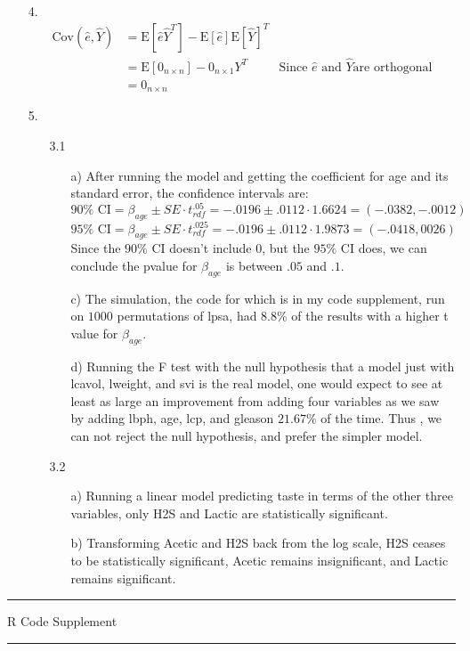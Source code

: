 \documentclass[11pt]{article}
\newcommand{\E}{\mathrm{E}}
\newcommand{\cov}{\mathrm{Cov}}
\theoremstyle{definition}
\begin{document}
\begin{itemize}
    \item[4.]
        \begin{align*}
            \cov(\hat e, \hat Y) &= \E\left[\hat e \hat Y^T\right] - \E\left[\hat e\right] \E\left[\hat Y\right]^T & \\
                                 &= \E\left[0_{n\times n}\right] - 0_{n \times 1} Y^T          & \mbox{Since } \hat e \mbox{ and } \hat Y \mbox{are orthogonal} \\
                                 &= 0_{n \times n}
        \end{align*}
    \item[5.]
        \begin{itemize}
            \item[3.1]
                \begin{itemize}
                    \item[a)]
                        After running the model and getting the coefficient for age and its standard error, the confidence intervals are:
                        \[ 90\% \mbox{ CI} = \beta_{age} \pm SE \cdot  t_{rdf}^{.05} = -.0196 \pm .0112 \cdot 1.6624 = (-.0382,-.0012) \]
                        \[ 95\% \mbox{ CI} = \beta_{age} \pm SE \cdot  t_{rdf}^{.025} = -.0196 \pm .0112 \cdot 1.9873 = (-.0418,0026) \]
                        Since the $90\%$ CI doesn't include $0$, but the $95\%$ CI does, we can conclude the pvalue for $\beta_{age}$ is between $.05$ and $.1$.
                    \item[c)]
                        The simulation, the code for which is in my code supplement, run on $1000$ permutations of lpsa, had $8.8\%$ of the results with a higher t value for $\beta_{age}$.
                    \item[d)]
                        Running the F test with the null hypothesis that a model just with lcavol, lweight, and svi is the real model, one would expect to see at least as large an improvement from adding four variables as we saw by adding lbph, age, lcp, and gleason $21.67\%$ of the time. Thus , we can not reject the null hypothesis, and prefer the simpler model.
                \end{itemize}
            \item[3.2]
                \begin{itemize}
                    \item[a)]
                        Running a linear model predicting taste in terms of the other three variables, only H2S and Lactic are statistically significant. 
                    \item[b)]
                        Transforming Acetic and H2S back from the log scale, H2S ceases to be statistically significant, Acetic remains insignificant, and Lactic remains significant. 
                \end{itemize}
                
        \end{itemize}
\end{itemize}

\newpage
\hrule
\vspace{2mm}
R Code Supplement
\vspace{2mm}
\hrule

\end{document}
